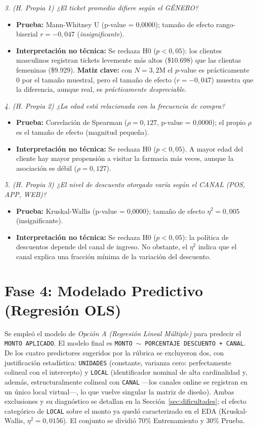 \documentclass[12pt,letterpaper]{article}
\begin{document}
\textit{3. (H. Propia 1) ¿El ticket promedio difiere según el GÉNERO?}
\begin{itemize}
    \item \textbf{Prueba:} Mann-Whitney U (p-value = 0,0000); tamaño de efecto rango-biserial $r=-0,047$ (\textit{insignificante}).
    \item \textbf{Interpretación no técnica:} Se rechaza H0 ($p < 0,05$): los clientes masculinos registran tickets levemente más altos (\$10.698) que las clientas femeninas (\$9.929). \textbf{Matiz clave:} con $N=3{,}2$M el $p$-value es prácticamente $0$ por el tamaño muestral, pero el tamaño de efecto ($r=-0,047$) muestra que la diferencia, aunque real, es \textit{prácticamente despreciable}.
\end{itemize}

\textit{4. (H. Propia 2) ¿La edad está relacionada con la frecuencia de compra?}
\begin{itemize}
    \item \textbf{Prueba:} Correlación de Spearman ($\rho=0,127$, p-value = 0,0000); el propio $\rho$ es el tamaño de efecto (magnitud pequeña).
    \item \textbf{Interpretación no técnica:} Se rechaza H0 ($p < 0,05$). A mayor edad del cliente hay mayor propensión a visitar la farmacia más veces, aunque la asociación es débil ($\rho=0,127$).
\end{itemize}

\textit{5. (H. Propia 3) ¿El nivel de descuento otorgado varía según el CANAL (POS, APP, WEB)?}
\begin{itemize}
    \item \textbf{Prueba:} Kruskal-Wallis (p-value = 0,0000); tamaño de efecto $\eta^2=0,005$ (insignificante).
    \item \textbf{Interpretación no técnica:} Se rechaza H0 ($p < 0,05$): la política de descuentos depende del canal de ingreso. No obstante, el $\eta^2$ indica que el canal explica una fracción mínima de la variación del descuento.
\end{itemize}

\section{Fase 4: Modelado Predictivo (Regresión OLS)}
Se empleó el modelo de \textit{Opción A (Regresión Lineal Múltiple)} para predecir el \texttt{MONTO APLICADO}. El modelo final es \texttt{MONTO $\sim$ PORCENTAJE DESCUENTO + CANAL}. De los cuatro predictores sugeridos por la rúbrica se excluyeron dos, con justificación estadística: \texttt{UNIDADES} (constante, varianza cero: perfectamente colineal con el intercepto) y \texttt{LOCAL} (identificador nominal de alta cardinalidad y, además, estructuralmente colineal con \texttt{CANAL} —los canales online se registran en un único local virtual—, lo que vuelve singular la matriz de diseño). Ambas exclusiones y su diagnóstico se detallan en la Sección~\ref{sec:dificultades}; el efecto categórico de \texttt{LOCAL} sobre el monto ya quedó caracterizado en el EDA (Kruskal-Wallis, $\eta^2=0{,}0156$). El conjunto se dividió 70\% Entrenamiento y 30\% Prueba.
\end{document}
